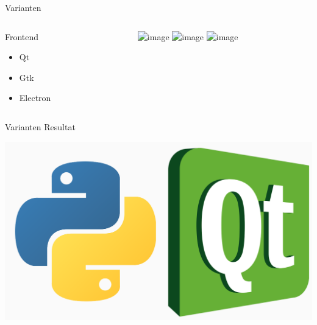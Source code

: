 \documentclass[12pt, aspectratio=1610]{beamer}
\begin{document}
\begin{frame}[label={sec:org0e7c972}]{Varianten}
\begin{columns}
\begin{column}{0.3\columnwidth}
\alert{Frontend}
\begin{itemize}
\item <2-> Qt
\item <3-> Gtk
\item <4-> Electron
\end{itemize}
\end{column}

\begin{column}{0.5\columnwidth}
\begin{center}
\includegraphics<2>[width=.9\linewidth]{pictures/frontend1.png}%
\includegraphics<3>[width=.9\linewidth]{pictures/frontend2.png}%
\includegraphics<4>[width=.9\linewidth]{pictures/frontend3.png}%
\end{center}
\end{column}
\end{columns}
\end{frame}

\begin{frame}[label={sec:org14d576a}]{Varianten}
\alert{Resultat}

\begin{center}
\includegraphics[height=.5\textheight]{pictures/pyqt.png}
\end{center}
\end{frame}
\end{document}
